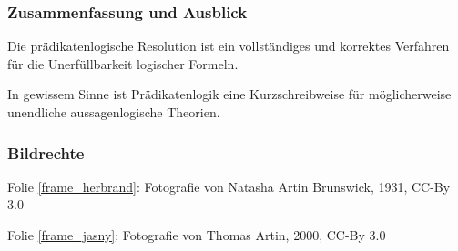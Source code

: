 \documentclass[aspectratio=1610,onlymath]{beamer}
\begin{document}
\begin{frame}\frametitle{Zusammenfassung und Ausblick}

Die prädikatenlogische Resolution ist ein vollständiges und korrektes Verfahren für die Unerfüllbarkeit logischer Formeln.\bigskip

In gewissem Sinne ist Prädikatenlogik eine Kurzschreibweise für möglicherweise unendliche aussagenlogische Theorien.
\bigskip




\end{frame}


\begin{frame}[t]\frametitle{Bildrechte}

Folie \ref{frame_herbrand}: Fotografie von Natasha Artin Brunswick, 1931, CC-By 3.0

Folie \ref{frame_jasny}: Fotografie von Thomas Artin, 2000, CC-By 3.0

\end{frame}
\end{document}
